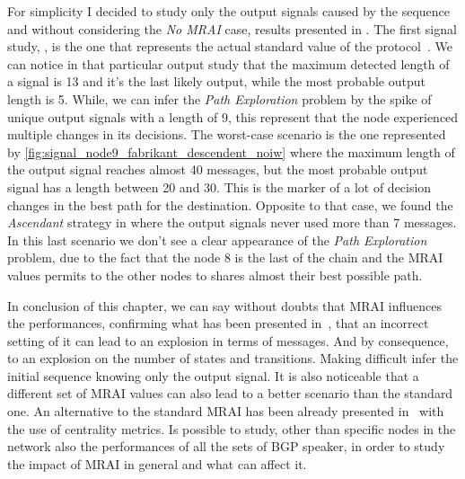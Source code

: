 For simplicity I decided to study only the output signals caused by the sequence
 and without considering the \textit{No MRAI} case, results presented in
.
The first signal study, , is the
one that represents the actual standard value of the protocol~\cite{rfc4271}.
We can notice in that particular output study that the maximum detected length of
a signal is \num{13} and it's the last likely output, while the most probable
output length is \num{5}.
While, we can infer the \textit{Path Exploration} problem by the spike of unique
output signals with a length of \num{9}, this represent that the node experienced multiple
changes in its decisions.
The worst-case scenario is the one represented by \cref{fig:signal_node9_fabrikant_descendent_noiw}
where the maximum length of the output signal reaches almost \num{40} messages, but
the most probable output signal has a length between \num{20} and \num{30}.
This is the marker of a lot of decision changes in the best path for the destination.
Opposite to that case, we found the \textit{Ascendant} strategy in
 where the output
signals never used more than \num{7} messages.
In this last scenario we don't see a clear appearance of the \textit{Path Exploration}
problem, due to the fact that the node \num{8} is the last of the chain and
the \ac{MRAI} values permits to the other nodes to shares almost their best
possible path.

In conclusion of this chapter, we can say without doubts that \ac{MRAI} influences
the performances, confirming what has been presented in~\cite{fabrikant2011there},
that an incorrect setting of it can lead to an explosion in terms of messages.
And by consequence, to an explosion on the number of states and transitions.
Making difficult infer the initial sequence knowing only the output signal.
It is also noticeable that a different set of \ac{MRAI} values can also lead
to a better scenario than the standard one.
An alternative to the standard \ac{MRAI} has been already presented in~\cite{milani2020improving}
with the use of centrality metrics.
Is possible to study, other than specific nodes in the network also the performances
of all the sets of \ac{BGP} speaker, in order to study the impact of \ac{MRAI}
in general and what can affect it.

